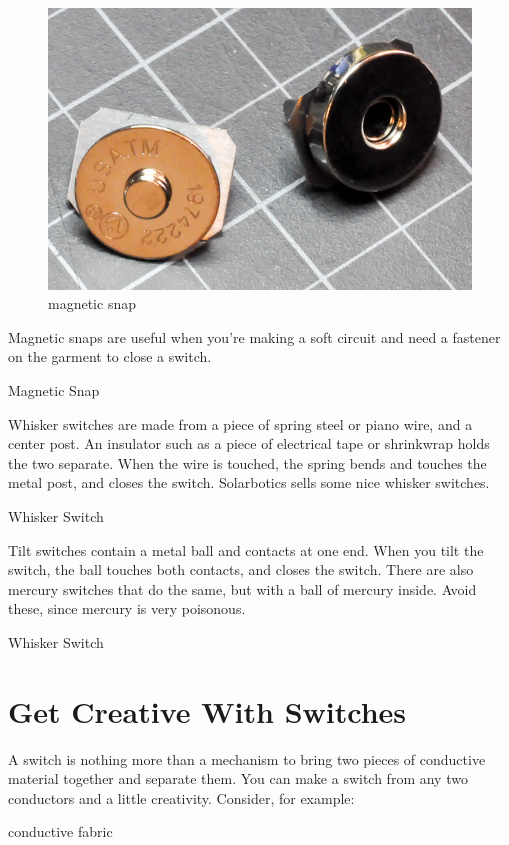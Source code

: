 \begin{figure}[!htb]
 \centering
 \includegraphics[scale=0.3]{img/switches/magnetic_snap.jpg}
 \caption{magnetic snap}
 \label{magnetic snap}
\end{figure}

Magnetic snaps are useful when you're making a soft circuit and need a fastener on the garment to close a switch.

Magnetic Snap

Whisker switches are made from a piece of spring steel or piano wire, and a center post. An insulator such as a piece of electrical tape or shrinkwrap holds the two separate. When the wire is touched, the spring bends and touches the metal post, and closes the switch. Solarbotics sells some nice whisker switches.

Whisker Switch

Tilt switches contain a metal ball and contacts at one end. When you tilt the switch, the ball touches both contacts, and closes the switch. There are also mercury switches that do the same, but with a ball of mercury inside. Avoid these, since mercury is very poisonous.

Whisker Switch

\section{Get Creative With Switches}

A switch is nothing more than a mechanism to bring two pieces of conductive material together and separate them. You can make a switch from any two conductors and a little creativity. Consider, for example:

conductive fabric

